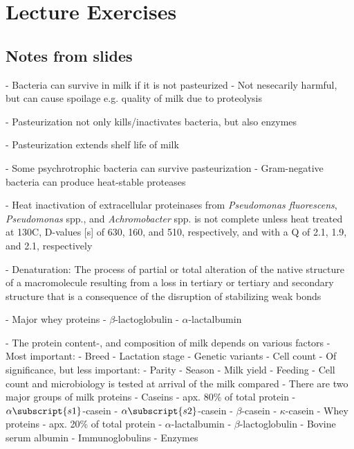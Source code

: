 \chapter{Lecture Exercises}
\setlength{\headheight}{22.94003pt}
\addtolength{\topmargin}{-10.22661pt}




\section{Notes from slides}

- Bacteria can survive in milk if it is not pasteurized
    - Not nesecarily harmful, but can cause spoilage e.g. quality of milk due to proteolysis

- Pasteurization not only kills/inactivates bacteria, but also enzymes

- Pasteurization extends shelf life of milk

- Some psychrotrophic bacteria can survive pasteurization
    - Gram-negative bacteria can produce heat-stable proteases

- Heat inactivation of extracellular proteinases from \textit{Pseudomonas fluorescens}, \textit{Pseudomonas} spp., and \textit{Achromobacter} spp. is not complete unless heat treated at 130\textdegree C, D-values [s] of 630, 160, and 510, respectively, and with a Q of 2.1, 1.9, and 2.1, respectively \cite*{s01_protein_degradation_in_bovine_milk}

- Denaturation: The process of partial or total alteration of the native structure of a macromolecule resulting from a loss in tertiary or tertiary and secondary structure that is a consequence of the disruption of stabilizing weak bonds

- Major whey proteins
    - $\beta$-lactoglobulin
    - $\alpha$-lactalbumin


- The protein content-, and composition of milk depends on various factors
    - Most important:
        - Breed
        - Lactation stage
        - Genetic variants
        - Cell count    
    - Of significance, but less important:
        - Parity
        - Season
        - Milk yield
        - Feeding
- Cell count and microbiology is tested at arrival of the milk compared
- There are two major groups of milk proteins
    - Caseins       - apx. 80\% of total protein
        - $\alpha\subscript{s1}$-casein
        - $\alpha\subscript{s2}$-casein
        - $\beta$-casein
        - $\kappa$-casein
    - Whey proteins - apx. 20\% of total protein
        - $\alpha$-lactalbumin
        - $\beta$-lactoglobulin
        - Bovine serum albumin
        - Immunoglobulins
        - Enzymes

